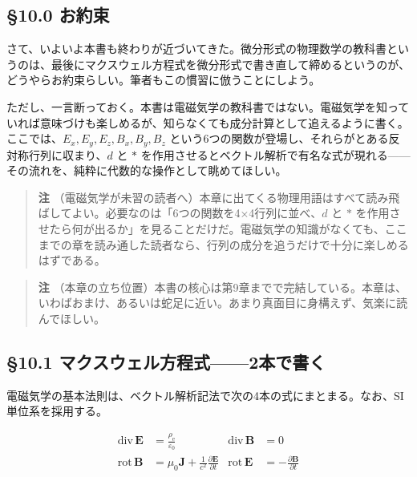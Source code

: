 \documentclass[a4paper,12pt,openany]{book}
\begin{document}
\hypertarget{ux304aux7d04ux675f}{%
\subsection{§10.0 お約束}\label{ux304aux7d04ux675f}}

さて、いよいよ本書も終わりが近づいてきた。微分形式の物理数学の教科書というのは、最後にマクスウェル方程式を微分形式で書き直して締めるというのが、どうやらお約束らしい。筆者もこの慣習に倣うことにしよう。

ただし、一言断っておく。本書は電磁気学の教科書ではない。電磁気学を知っていれば意味づけも楽しめるが、知らなくても成分計算として追えるように書く。ここでは、\(E_x, E_y, E_z, B_x, B_y, B_z\)
という6つの関数が登場し、それらがとある反対称行列に収まり、\(d\) と
\(\ast\)
を作用させるとベクトル解析で有名な式が現れる——その流れを、純粋に代数的な操作として眺めてほしい。

\begin{quote}
\textbf{注}
（電磁気学が未習の読者へ）本章に出てくる物理用語はすべて読み飛ばしてよい。必要なのは「6つの関数を4×4行列に並べ、\(d\)
と \(\ast\)
を作用させたら何が出るか」を見ることだけだ。電磁気学の知識がなくても、ここまでの章を読み通した読者なら、行列の成分を追うだけで十分に楽しめるはずである。
\end{quote}

\begin{quote}
\textbf{注}
（本章の立ち位置）本書の核心は第9章までで完結している。本章は、いわばおまけ、あるいは蛇足に近い。あまり真面目に身構えず、気楽に読んでほしい。
\end{quote}

\par\vspace{0.35em}\par

\hypertarget{ux30deux30afux30b9ux30a6ux30a7ux30ebux65b9ux7a0bux5f0f2ux672cux3067ux66f8ux304f}{%
\subsection{§10.1
マクスウェル方程式——2本で書く}\label{ux30deux30afux30b9ux30a6ux30a7ux30ebux65b9ux7a0bux5f0f2ux672cux3067ux66f8ux304f}}

電磁気学の基本法則は、ベクトル解析記法で次の4本の式にまとまる。なお、SI単位系を採用する。

\[\begin{aligned}
\mathrm{div}\,\mathbf{E} &= \frac{\rho_{\mathrm e}}{\varepsilon_0} &
\mathrm{div}\,\mathbf{B} &= 0 \\[0.5em]
\mathrm{rot}\,\mathbf{B} &= \mu_0\mathbf{J} + \frac{1}{c^2}\frac{\partial \mathbf{E}}{\partial t} &
\mathrm{rot}\,\mathbf{E} &= -\frac{\partial \mathbf{B}}{\partial t}
\end{aligned}\]
\end{document}
